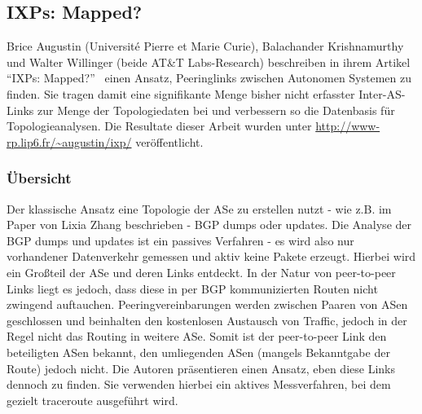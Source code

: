 \subsection{IXPs: Mapped?}\label{subsec:ixps}

Brice Augustin (Université Pierre et Marie Curie), Balachander Krishnamurthy  und Walter Willinger (beide AT\&T Labs-Research) beschreiben in ihrem Artikel "`IXPs: Mapped?"'~\cite{Augustin:2009:IM:1644893.1644934} einen Ansatz, Peeringlinks zwischen Autonomen Systemen zu finden.
Sie tragen damit eine signifikante Menge bisher nicht erfasster Inter-AS-Links zur Menge der Topologiedaten bei und verbessern so die Datenbasis für Topologieanalysen.
Die Resultate dieser Arbeit wurden unter \url{http://www-rp.lip6.fr/~augustin/ixp/} veröffentlicht.

\subsubsection{Übersicht}
Der klassische Ansatz eine Topologie der ASe zu erstellen nutzt - wie z.B. im Paper von Lixia Zhang beschrieben - BGP dumps oder updates.
Die Analyse der BGP dumps und updates ist ein passives Verfahren - es wird also nur vorhandener Datenverkehr gemessen und aktiv keine Pakete erzeugt.
Hierbei wird ein Großteil der ASe und deren Links entdeckt.
In der Natur von peer-to-peer Links liegt es jedoch, dass diese in per BGP kommunizierten Routen nicht zwingend auftauchen.
Peeringvereinbarungen werden zwischen Paaren von ASen geschlossen und beinhalten den kostenlosen Austausch von Traffic, jedoch in der Regel nicht das Routing in weitere ASe.
Somit ist der peer-to-peer Link den beteiligten ASen bekannt, den umliegenden ASen (mangels Bekanntgabe der Route) jedoch nicht.
Die Autoren präsentieren einen Ansatz, eben diese Links dennoch zu finden.
Sie verwenden hierbei ein aktives Messverfahren, bei dem gezielt traceroute ausgeführt wird.

